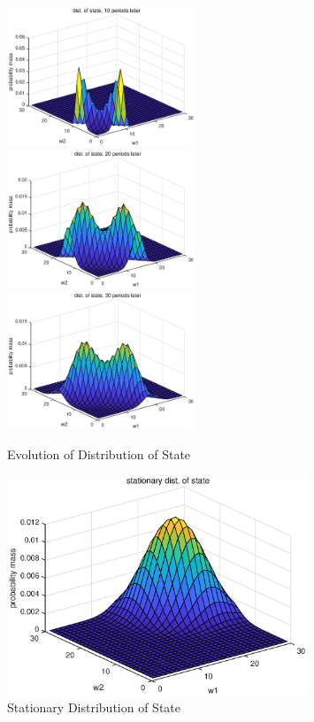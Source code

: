 \documentclass[10pt, letterpaper]{article}
\begin{document}
\begin{figure}
\centering
\includegraphics[width=0.5\textwidth]{10period.eps}\\
\includegraphics[width=0.5\textwidth]{20period.eps}\\
\includegraphics[width=0.5\textwidth]{30period.eps}
\caption{Evolution of Distribution of State}
\end{figure}


\begin{figure}
\centering
\includegraphics[width=0.8\textwidth]{stationary.eps}
\caption{Stationary Distribution of State}
\end{figure}
\end{document}
